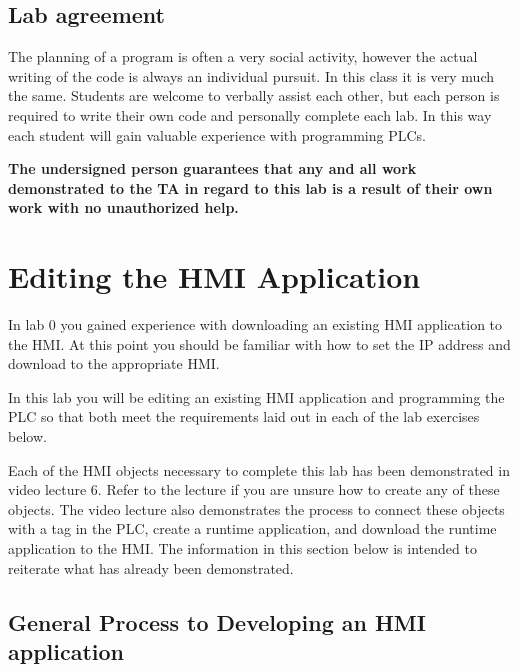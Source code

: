 \subsection{Lab agreement}

The planning of a program is often a very social activity, however the actual writing of the code is always an individual pursuit. In this class it is very much the same. Students are welcome to verbally assist each other, but each person is required to write their own code and personally complete each lab. In this way each student will gain valuable experience with programming PLCs. 

\textbf{The undersigned person guarantees that any and all work demonstrated to the TA in regard to this lab is a result of their own work with no unauthorized help.}




\section{Editing the HMI Application}

In lab 0 you gained experience with downloading an existing HMI application to the HMI. At this point you should be familiar with how to set the IP address and download to the appropriate HMI. 

In this lab you will be editing an existing HMI application and programming the PLC so that both meet the requirements laid out in each of the lab exercises below. 

Each of the HMI objects necessary to complete this lab has been demonstrated in video lecture 6. Refer to the lecture if you are unsure how to create any of these objects. The video lecture also demonstrates the process to connect these objects with a tag in the PLC, create a runtime application, and download the runtime application to the HMI. The information in this section below is intended to reiterate what has already been demonstrated. 



\subsection{General Process to Developing an HMI application}

